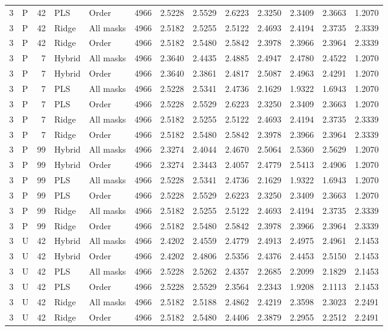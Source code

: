 \documentclass[10pt,a4paper]{article}
\begin{document}
\begin{longtable}{rlrllrrrrrrrr}
3 & P & 42 & PLS & Order & 4966 & 2.5228 & 2.5529 & 2.6223 & 2.3250 & 2.3409 & 2.3663 & 1.2070 \\
3 & P & 42 & Ridge & All masks & 4966 & 2.5182 & 2.5255 & 2.5122 & 2.4693 & 2.4194 & 2.3735 & 2.3339 \\
3 & P & 42 & Ridge & Order & 4966 & 2.5182 & 2.5480 & 2.5842 & 2.3978 & 2.3966 & 2.3964 & 2.3339 \\
3 & P & 7 & Hybrid & All masks & 4966 & 2.3640 & 2.4435 & 2.4885 & 2.4947 & 2.4780 & 2.4522 & 1.2070 \\
3 & P & 7 & Hybrid & Order & 4966 & 2.3640 & 2.3861 & 2.4817 & 2.5087 & 2.4963 & 2.4291 & 1.2070 \\
3 & P & 7 & PLS & All masks & 4966 & 2.5228 & 2.5341 & 2.4736 & 2.1629 & 1.9322 & 1.6943 & 1.2070 \\
3 & P & 7 & PLS & Order & 4966 & 2.5228 & 2.5529 & 2.6223 & 2.3250 & 2.3409 & 2.3663 & 1.2070 \\
3 & P & 7 & Ridge & All masks & 4966 & 2.5182 & 2.5255 & 2.5122 & 2.4693 & 2.4194 & 2.3735 & 2.3339 \\
3 & P & 7 & Ridge & Order & 4966 & 2.5182 & 2.5480 & 2.5842 & 2.3978 & 2.3966 & 2.3964 & 2.3339 \\
3 & P & 99 & Hybrid & All masks & 4966 & 2.3274 & 2.4044 & 2.4670 & 2.5064 & 2.5360 & 2.5629 & 1.2070 \\
3 & P & 99 & Hybrid & Order & 4966 & 2.3274 & 2.3443 & 2.4057 & 2.4779 & 2.5413 & 2.4906 & 1.2070 \\
3 & P & 99 & PLS & All masks & 4966 & 2.5228 & 2.5341 & 2.4736 & 2.1629 & 1.9322 & 1.6943 & 1.2070 \\
3 & P & 99 & PLS & Order & 4966 & 2.5228 & 2.5529 & 2.6223 & 2.3250 & 2.3409 & 2.3663 & 1.2070 \\
3 & P & 99 & Ridge & All masks & 4966 & 2.5182 & 2.5255 & 2.5122 & 2.4693 & 2.4194 & 2.3735 & 2.3339 \\
3 & P & 99 & Ridge & Order & 4966 & 2.5182 & 2.5480 & 2.5842 & 2.3978 & 2.3966 & 2.3964 & 2.3339 \\
3 & U & 42 & Hybrid & All masks & 4966 & 2.4202 & 2.4559 & 2.4779 & 2.4913 & 2.4975 & 2.4961 & 2.1453 \\
3 & U & 42 & Hybrid & Order & 4966 & 2.4202 & 2.4806 & 2.5356 & 2.4376 & 2.4453 & 2.5150 & 2.1453 \\
3 & U & 42 & PLS & All masks & 4966 & 2.5228 & 2.5262 & 2.4357 & 2.2685 & 2.2099 & 2.1829 & 2.1453 \\
3 & U & 42 & PLS & Order & 4966 & 2.5228 & 2.5529 & 2.3564 & 2.2343 & 1.9208 & 2.1113 & 2.1453 \\
3 & U & 42 & Ridge & All masks & 4966 & 2.5182 & 2.5188 & 2.4862 & 2.4219 & 2.3598 & 2.3023 & 2.2491 \\
3 & U & 42 & Ridge & Order & 4966 & 2.5182 & 2.5480 & 2.4406 & 2.3879 & 2.2955 & 2.2512 & 2.2491 \\
\end{longtable}
\endgroup
\end{document}
